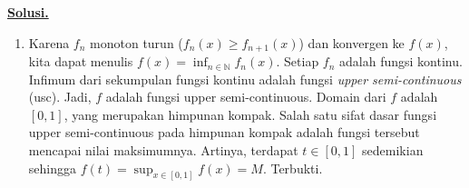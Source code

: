 \documentclass[12pt,twoside]{article}
\newenvironment{solution}
{
	\par\noindent\textbf{\underline{Solusi.}}\\
}
{
	\par
}
\begin{document}
\begin{enumerate}
        \begin{solution}
          \begin{enumerate}
            \item[(1)] Karena $f_n$ monoton turun ($f_n(x) \ge f_{n+1}(x)$) dan konvergen ke $f(x)$, kita dapat menulis $f(x) = \inf_{n \in \mathbb{N}} f_n(x)$.
                  Setiap $f_n$ adalah fungsi kontinu. Infimum dari sekumpulan fungsi kontinu adalah fungsi \textit{upper semi-continuous} (usc).
                  Jadi, $f$ adalah fungsi upper semi-continuous.
                  Domain dari $f$ adalah $[0, 1]$, yang merupakan himpunan kompak.
                  Salah satu sifat dasar fungsi upper semi-continuous pada himpunan kompak adalah fungsi tersebut mencapai nilai maksimumnya.
                  Artinya, terdapat $t \in [0, 1]$ sedemikian sehingga $f(t) = \sup_{x \in [0, 1]} f(x) = M$.
                  Terbukti.


\end{enumerate}
\end{solution}
\end{enumerate}
\end{document}
